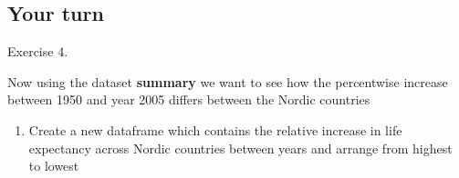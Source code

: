 \documentclass[
]{book}
\providecommand{\tightlist}{%
  \setlength{\itemsep}{0pt}\setlength{\parskip}{0pt}}
\begin{document}
\hypertarget{your-turn-1}{%
\subsection{Your turn}\label{your-turn-1}}

Exercise 4.

Now using the dataset \textbf{summary} we want to see how the
percentwise increase between 1950 and year 2005 differs between the
Nordic countries

\begin{enumerate}
\def\labelenumi{\arabic{enumi}.}
\tightlist
\item
  Create a new dataframe which contains the relative increase in life
  expectancy across Nordic countries between years and arrange from
  highest to lowest
\end{enumerate}

\backmatter
\end{document}
